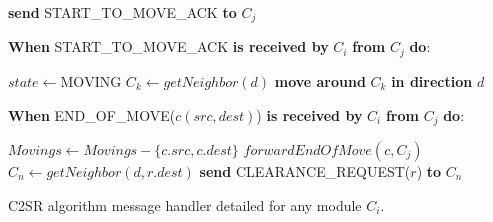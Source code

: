 {{		{\bf send} START\_TO\_MOVE\_ACK {\bf to} $C_j$\;
		
		\BlankLine
		\BlankLine
		
		{\bf When} START\_TO\_MOVE\_ACK {\bf is received by} ${C_i}$
		{\bf from} ${C_j}$ {\bf do}:
		
		$state \gets \mathrm{MOVING}$\;
		$C_k \gets getNeighbor(d)$\;
		{\bf move around} $C_k$ {\bf in direction} $d$\;
		\label{alg:reconfiguration:c2sr:line:start-move-and-ack-end}
		\BlankLine
		\BlankLine

		{\bf When} END\_OF\_MOVE($c(src,dest)$) {\bf is received by} ${C_i}$
		{\bf from} ${C_j}$ {\bf do}:
		
		\label{alg:reconfiguration:c2sr:line:end-of-move-start}
		$Movings \gets Movings - \{c.src, c.dest\}$\;
		$forwardEndOfMove(c, C_j)$\;
		  {
			\label{alg:reconfiguration:c2sr:line:reactivated-delayed-clearance-start}
			$C_n \gets getNeighbor(d,r.dest)$\;
			 {
				{\bf send} CLEARANCE\_REQUEST($r$) {\bf to} $C_n$\;
			} 
		}
		\label{alg:reconfiguration:c2sr:line:reactivated-delayed-clearance-end}
		\label{alg:reconfiguration:c2sr:line:end-of-move-end}	
		\caption{C2SR algorithm message handler detailed for any module ${C_i}$.\label{alg:reconfiguration:c2sr:msg}}
}

}

